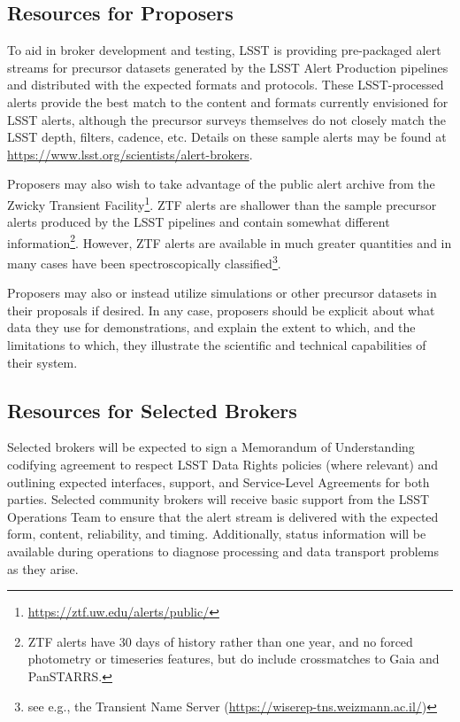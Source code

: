 \subsection{Resources for Proposers}

To aid in broker development and testing, LSST is providing pre-packaged alert streams for precursor datasets generated by the LSST Alert Production pipelines and distributed with the expected formats and protocols.
These LSST-processed alerts provide the best match to the content and formats currently envisioned for LSST alerts, although the precursor surveys themselves do not closely match the LSST depth, filters, cadence, etc.
Details on these sample alerts may be found at \url{https://www.lsst.org/scientists/alert-brokers}.

Proposers may also wish to take advantage of the public alert archive from the Zwicky Transient Facility\footnote{\url{https://ztf.uw.edu/alerts/public/}}.
ZTF alerts are shallower than the sample precursor alerts produced by the LSST pipelines and contain somewhat different information\footnote{ZTF alerts have
30 days of history rather than one year, and no forced photometry or
timeseries features, but do include crossmatches to Gaia and PanSTARRS.}.
However, ZTF alerts are available in much greater quantities and in many
cases have been spectroscopically classified\footnote{see e.g., the Transient
Name Server (\url{https://wiserep-tns.weizmann.ac.il/})}.

Proposers may also or instead utilize simulations or other precursor datasets in their proposals if desired.
In any case, proposers should be explicit about what data they use for demonstrations, and explain the extent to which, and the limitations to which, they illustrate the scientific and technical capabilities of their system.

\subsection{Resources for Selected Brokers}

Selected brokers will be expected to sign a Memorandum of Understanding codifying agreement to respect LSST Data Rights policies (where relevant) and outlining expected interfaces, support, and Service-Level Agreements for both parties.
Selected community brokers will receive basic support from the LSST Operations Team to ensure that the alert stream is delivered with the expected form, content, reliability, and timing.
Additionally, status information will be available during operations to diagnose processing and data transport problems as they arise.

